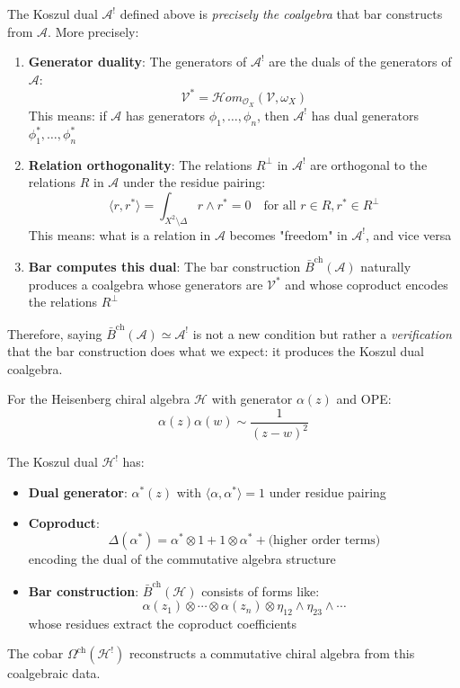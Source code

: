 \begin{remark}\label{rem:koszul-dual-meaning}
The Koszul dual $\mathcal{A}^!$ defined above is \emph{precisely the coalgebra} that bar constructs from $\mathcal{A}$. More precisely:

\begin{enumerate}
\item \textbf{Generator duality}: The generators of $\mathcal{A}^!$ are the duals of the generators of $\mathcal{A}$:
   $$\mathcal{V}^* = \mathcal{H}om_{\mathcal{O}_X}(\mathcal{V}, \omega_X)$$
   This means: if $\mathcal{A}$ has generators $\phi_1, \ldots, \phi_n$, then $\mathcal{A}^!$ has dual generators $\phi_1^*, \ldots, \phi_n^*$

\item \textbf{Relation orthogonality}: The relations $R^{\perp}$ in $\mathcal{A}^!$ are orthogonal to the relations $R$ in $\mathcal{A}$ under the residue pairing:
   $$\langle r, r^* \rangle = \int_{X^2 \setminus \Delta} r \wedge r^* = 0 \quad \text{for all } r \in R, r^* \in R^{\perp}$$
   This means: what is a relation in $\mathcal{A}$ becomes "freedom" in $\mathcal{A}^!$, and vice versa

\item \textbf{Bar computes this dual}: The bar construction $\bar{B}^{\text{ch}}(\mathcal{A})$ naturally produces a coalgebra whose generators are $\mathcal{V}^*$ and whose coproduct encodes the relations $R^{\perp}$
\end{enumerate}

Therefore, saying $\bar{B}^{\text{ch}}(\mathcal{A}) \simeq \mathcal{A}^!$ is not a new condition but rather a \emph{verification} that the bar construction does what we expect: it produces the Koszul dual coalgebra.
\end{remark}

\begin{example}
For the Heisenberg chiral algebra $\mathcal{H}$ with generator $\alpha(z)$ and OPE:
$$\alpha(z)\alpha(w) \sim \frac{1}{(z-w)^2}$$

The Koszul dual $\mathcal{H}^!$ has:
\begin{itemize}
\item \textbf{Dual generator}: $\alpha^*(z)$ with $\langle \alpha, \alpha^* \rangle = 1$ under residue pairing
\item \textbf{Coproduct}: 
   $$\Delta(\alpha^*) = \alpha^* \otimes 1 + 1 \otimes \alpha^* + \text{(higher order terms)}$$
   encoding the dual of the commutative algebra structure
\item \textbf{Bar construction}: $\bar{B}^{\text{ch}}(\mathcal{H})$ consists of forms like:
   $$\alpha(z_1) \otimes \cdots \otimes \alpha(z_n) \otimes \eta_{12} \wedge \eta_{23} \wedge \cdots$$
   whose residues extract the coproduct coefficients
\end{itemize}

The cobar $\Omega^{\text{ch}}(\mathcal{H}^!)$ reconstructs a commutative chiral algebra from this coalgebraic data.
\end{example}

